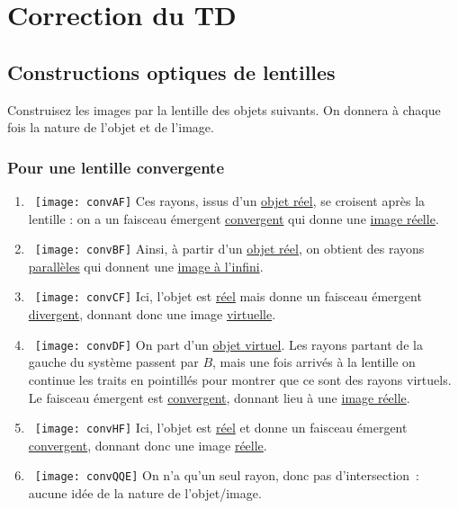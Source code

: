 \documentclass[a4paper, 12pt, final, garamond]{book}
\begin{document}
\setcounter{chapter}{2}

\chapter{Correction du TD}

\section{Constructions optiques de lentilles}

Construisez les images par la lentille des objets suivants. On donnera à chaque
fois la nature de l'objet et de l'image.

\subsection{Pour une lentille convergente}
\begin{multicols}{2}
    \begin{enumerate}
        \item ~\smallbreak\texttt{[image: convAF]}
            Ces rayons, issus d'un \underline{objet réel}, se croisent après la
        lentille : on a un faisceau émergent \underline{convergent} qui
        donne une \underline{image réelle}.
        \item ~\smallbreak\texttt{[image: convBF]}
            Ainsi, à partir d'un \underline{objet réel}, on obtient des rayons
            \underline{parallèles} qui donnent une \underline{image à l'infini}.
            \columnbreak
        \item ~\smallbreak\texttt{[image: convCF]}
            Ici, l'objet est \underline{réel} mais donne un faisceau émergent
            \underline{divergent}, donnant donc une image \underline{virtuelle}.
        \item ~\smallbreak\texttt{[image: convDF]}
            On part d'un \underline{objet virtuel}. Les rayons partant de la
            gauche du système passent par $B$, mais une fois arrivés à la
            lentille on continue les traits en pointillés pour montrer que ce
            sont des rayons virtuels. Le faisceau émergent est
            \underline{convergent}, donnant lieu à une \underline{image réelle}.
            \columnbreak
        \item ~\smallbreak\texttt{[image: convHF]}
            Ici, l'objet est \underline{réel} et donne un faisceau émergent
            \underline{convergent}, donnant donc une image \underline{réelle}.
        \item ~\smallbreak\texttt{[image: convQQE]}
            On n'a qu'un seul rayon, donc pas d'intersection~: aucune idée de la
            nature de l'objet/image.
    \end{enumerate}
\end{multicols}
\end{document}
